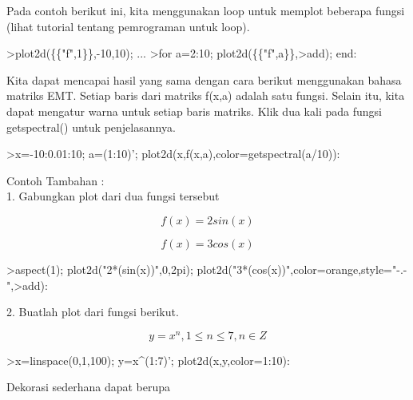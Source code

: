 \documentclass[12pt,arial,letterpaper]{book}
\begin{document}
\begin{eulercomment}
\begin{eulercomment}
\begin{eulercomment}
\begin{eulercomment}
\begin{eulercomment}
\begin{eulercomment}
\begin{eulercomment}
\begin{eulercomment}
\begin{eulercomment}
\begin{eulercomment}
\begin{eulercomment}
\begin{eulercomment}
\begin{eulercomment}
\begin{eulercomment}
\begin{eulercomment}
\begin{eulercomment}
\begin{eulercomment}
Pada contoh berikut ini, kita menggunakan loop untuk memplot beberapa
fungsi (lihat tutorial tentang pemrograman untuk loop).
\end{eulercomment}
\begin{eulerprompt}
>plot2d(\{\{"f",1\}\},-10,10); ...
>for a=2:10; plot2d(\{\{"f",a\}\},>add); end:
\end{eulerprompt}
\begin{eulercomment}
Kita dapat mencapai hasil yang sama dengan cara berikut menggunakan
bahasa matriks EMT. Setiap baris dari matriks f(x,a) adalah satu
fungsi. Selain itu, kita dapat mengatur warna untuk setiap baris
matriks. Klik dua kali pada fungsi getspectral() untuk penjelasannya.
\end{eulercomment}
\begin{eulerprompt}
>x=-10:0.01:10; a=(1:10)'; plot2d(x,f(x,a),color=getspectral(a/10)):
\end{eulerprompt}
\begin{eulercomment}
Contoh Tambahan :\\
1. Gabungkan plot dari dua fungsi tersebut\\
\end{eulercomment}
\begin{eulerformula}
\[
f(x)=2sin(x)
\]
\end{eulerformula}
\begin{eulerformula}
\[
f(x)=3cos(x)
\]
\end{eulerformula}
\begin{eulerprompt}
>aspect(1); plot2d("2*(sin(x))",0,2pi); plot2d("3*(cos(x))",color=orange,style="-.-",>add):
\end{eulerprompt}
\begin{eulercomment}
2. Buatlah plot dari fungsi berikut.\\
\end{eulercomment}
\begin{eulerformula}
\[
y=x^n, 1\le n \le 7, n\in Z
\]
\end{eulerformula}
\begin{eulerprompt}
>x=linspace(0,1,100); y=x^(1:7)'; plot2d(x,y,color=1:10):
\end{eulerprompt}
\begin{eulercomment}
Dekorasi sederhana dapat berupa


\end{eulercomment}
\end{eulercomment}
\end{eulercomment}
\end{eulercomment}
\end{eulercomment}
\end{eulercomment}
\end{eulercomment}
\end{eulercomment}
\end{eulercomment}
\end{eulercomment}
\end{eulercomment}
\end{eulercomment}
\end{eulercomment}
\end{eulercomment}
\end{eulercomment}
\end{eulercomment}
\end{eulercomment}
\end{document}
